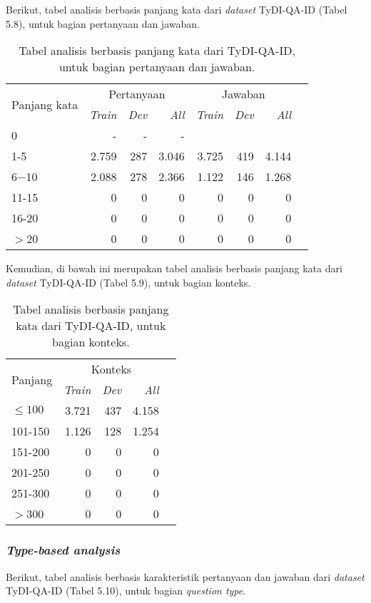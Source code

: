 Berikut, tabel analisis berbasis panjang kata dari \emph{dataset} TyDI-QA-ID (Tabel 5.8), untuk bagian pertanyaan dan jawaban.

\begin{table}[H]\centering
\begin{tabular}{lrrrrrrr}\toprule
\multirow{2}{*}{Panjang kata} &\multicolumn{3}{c}{Pertanyaan} &\multicolumn{3}{c}{Jawaban} \\\cmidrule{2-7}
&\emph{Train} &\emph{Dev} &\emph{All} &\emph{Train} &\emph{Dev} &\emph{All} \\\midrule
0 &- &- &- & & & \\
1-5 &2.759 &287 &3.046 &3.725 &419 &4.144 \\
6$-$10 &2.088 &278 &2.366 &1.122 &146 &1.268 \\
11-15 &0 &0 &0 &0 &0 &0 \\
16-20 &0 &0 &0 &0 &0 &0 \\
$>$20 &0 &0 &0 &0 &0 &0 \\
\bottomrule
\end{tabular}
\caption{Tabel analisis berbasis panjang kata dari TyDI-QA-ID, untuk bagian pertanyaan dan jawaban.}
\end{table}

Kemudian, di bawah ini merupakan tabel analisis berbasis panjang kata dari \emph{dataset} TyDI-QA-ID (Tabel 5.9), untuk bagian konteks.

\begin{table}[H]\centering
\begin{tabular}{lrrrr}\toprule
\multirow{2}{*}{Panjang} &\multicolumn{3}{c}{Konteks} \\\cmidrule{2-4}
&\emph{Train} &\emph{Dev} &\emph{All} \\\midrule
$\leq100$ &3.721 &437 &4.158 \\
101-150 &1.126 &128 &1.254 \\
151-200 &0 &0 &0 \\
201-250 &0 &0 &0 \\
251-300 &0 &0 &0 \\
$>$300 &0 &0 &0 \\
\bottomrule
\end{tabular}
\caption{Tabel analisis berbasis panjang kata dari TyDI-QA-ID, untuk bagian konteks.}
\end{table}

\subsubsection{\emph{Type-based analysis}}
Berikut, tabel analisis berbasis karakteristik pertanyaan dan jawaban dari \emph{dataset} TyDI-QA-ID (Tabel 5.10), untuk bagian \emph{question type}.

